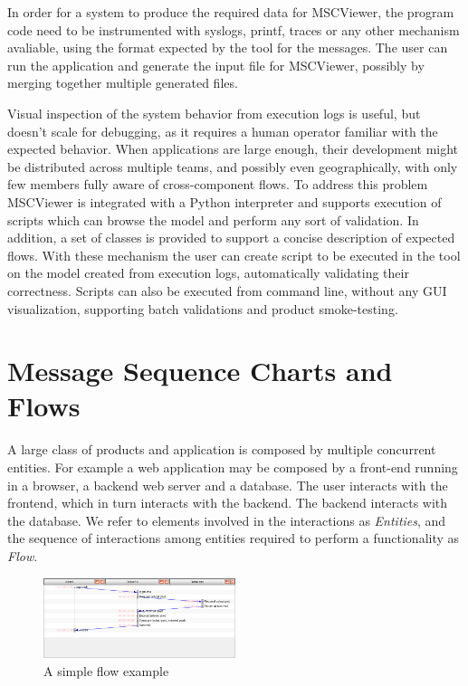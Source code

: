 \documentclass[11pt, twoside, titlepage]{book}
\newcommand{\prog}{MSCViewer}
\newcommand{\defterm}[1]{\textit{#1}\index{#1}}
\begin{document}
In order for a system to produce the required data for \prog{}, the program code 
need to be instrumented with syslogs, printf, traces or any other mechanism avaliable,
using the format expected by the tool for the messages.
The user can run the application and generate the input file for \prog{}, possibly
by merging together multiple generated files. 

Visual inspection of the system behavior from execution logs is useful, but doesn't
scale for debugging, as it requires a human operator familiar with the expected behavior.
When applications are large enough, their development might be distributed
across multiple teams, and possibly even geographically, with only few members
fully aware of cross-component flows. To address this problem \prog{} is 
integrated with a Python interpreter and supports execution of scripts which 
can browse the model and perform any sort of validation. In addition, a set
of classes is provided to support a concise description of expected flows.
With these mechanism the user can create script to be executed in
the tool on the model created from execution logs, automatically validating 
their correctness. Scripts can also be executed from command line, without 
any GUI visualization, supporting batch validations and product smoke-testing.

\section{Message Sequence Charts and Flows}
A large class of products and application is composed by multiple concurrent
entities. For example a web application may be composed by a front-end running
in a browser, a backend web server and a database. The user interacts with the 
frontend, which in turn interacts with the backend. The backend interacts with
the database. We refer to elements involved in the interactions as 
\defterm{Entities}, and the sequence of interactions among entities required to
perform a functionality as \defterm{Flow}. 

\begin{figure}[ht!]
  \centering
  \includegraphics[width=0.5\textwidth,natwidth=1024,natheight=600]{images/simple-flow.png}
  \caption{A simple flow example}
  \label{fig:simple-flow} 
\end{figure}  
 
\end{document}
